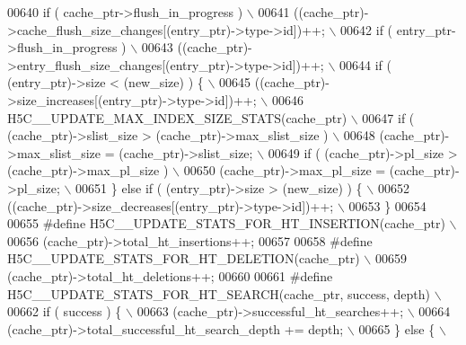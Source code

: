 \begin{DoxyCode}
00640 \textcolor{preprocessor}{    if ( cache\_ptr->flush\_in\_progress )                                    \(\backslash\)}
00641 \textcolor{preprocessor}{            ((cache\_ptr)->cache\_flush\_size\_changes[(entry\_ptr)->type->id])++;  \(\backslash\)}
00642 \textcolor{preprocessor}{        if ( entry\_ptr->flush\_in\_progress )                                    \(\backslash\)}
00643 \textcolor{preprocessor}{            ((cache\_ptr)->entry\_flush\_size\_changes[(entry\_ptr)->type->id])++;  \(\backslash\)}
00644 \textcolor{preprocessor}{    if ( (entry\_ptr)->size < (new\_size) ) \{                                \(\backslash\)}
00645 \textcolor{preprocessor}{        ((cache\_ptr)->size\_increases[(entry\_ptr)->type->id])++;            \(\backslash\)}
00646 \textcolor{preprocessor}{            H5C\_\_UPDATE\_MAX\_INDEX\_SIZE\_STATS(cache\_ptr)                        \(\backslash\)}
00647 \textcolor{preprocessor}{            if ( (cache\_ptr)->slist\_size > (cache\_ptr)->max\_slist\_size )       \(\backslash\)}
00648 \textcolor{preprocessor}{                (cache\_ptr)->max\_slist\_size = (cache\_ptr)->slist\_size;         \(\backslash\)}
00649 \textcolor{preprocessor}{            if ( (cache\_ptr)->pl\_size > (cache\_ptr)->max\_pl\_size )             \(\backslash\)}
00650 \textcolor{preprocessor}{                (cache\_ptr)->max\_pl\_size = (cache\_ptr)->pl\_size;               \(\backslash\)}
00651 \textcolor{preprocessor}{    \} else if ( (entry\_ptr)->size > (new\_size) ) \{                         \(\backslash\)}
00652 \textcolor{preprocessor}{        ((cache\_ptr)->size\_decreases[(entry\_ptr)->type->id])++;            \(\backslash\)}
00653 \textcolor{preprocessor}{    \}}
00654 
00655 \textcolor{preprocessor}{#define H5C\_\_UPDATE\_STATS\_FOR\_HT\_INSERTION(cache\_ptr) \(\backslash\)}
00656 \textcolor{preprocessor}{    (cache\_ptr)->total\_ht\_insertions++;}
00657 
00658 \textcolor{preprocessor}{#define H5C\_\_UPDATE\_STATS\_FOR\_HT\_DELETION(cache\_ptr) \(\backslash\)}
00659 \textcolor{preprocessor}{    (cache\_ptr)->total\_ht\_deletions++;}
00660 
00661 \textcolor{preprocessor}{#define H5C\_\_UPDATE\_STATS\_FOR\_HT\_SEARCH(cache\_ptr, success, depth)  \(\backslash\)}
00662 \textcolor{preprocessor}{    if ( success ) \{                                            \(\backslash\)}
00663 \textcolor{preprocessor}{        (cache\_ptr)->successful\_ht\_searches++;                  \(\backslash\)}
00664 \textcolor{preprocessor}{        (cache\_ptr)->total\_successful\_ht\_search\_depth += depth; \(\backslash\)}
00665 \textcolor{preprocessor}{    \} else \{                                                    \(\backslash\)}

\end{DoxyCode}
